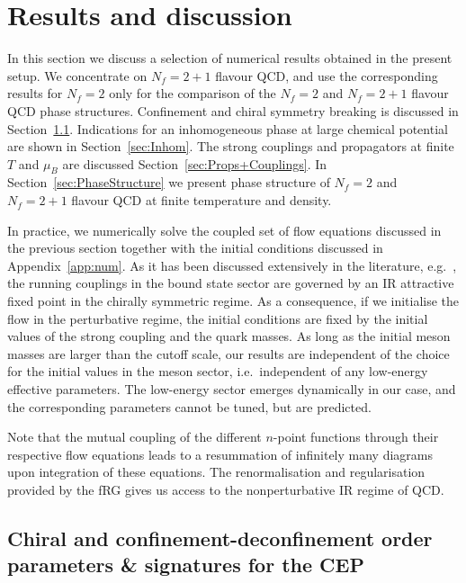 \documentclass[%
reprint,
superscriptaddress,
showpacs,preprintnumbers,
 amsmath,amssymb,
 aps,
prd,
]{revtex4-1}
\def\sec#1{Section~\ref{#1}}
\def\app#1{Appendix~\ref{#1}}
\begin{document}
\section{Results and discussion}
\label{sec:num}
%

In this section we discuss a selection of numerical results obtained
in the present setup. We concentrate on $N_f=2+1$ flavour QCD, and use
the corresponding results for $N_f=2$ only for the comparison of the
$N_f=2$ and $N_f=2+1$ flavour QCD phase structures. Confinement and
chiral symmetry breaking is discussed in
\sec{sec:Conf+Chiral}. Indications for an inhomogeneous phase at large
chemical potential are shown in \sec{sec:Inhom}. The strong couplings
and propagators at finite $T$ and $\mu_B$ are discussed
\sec{sec:Props+Couplings}. In \sec{sec:PhaseStructure} we present
phase structure of $N_f=2$ and $N_f=2+1$ flavour QCD at finite
temperature and density.


In practice, we numerically solve the coupled set of flow equations
discussed in the previous section together with the initial conditions
discussed in \app{app:num}. As it has been discussed extensively in
the literature, e.g.\, \cite{Gies:2002hq, Braun:2005uj, Braun:2009ns,
  Braun:2010qs, Mitter:2014wpa,Braun:2014ata,Pawlowski:2014aha,
  Rennecke:2015eba,Cyrol:2017ewj}, the running couplings in the bound
state sector are governed by an IR attractive fixed point in the
chirally symmetric regime. As a consequence, if we initialise the flow
in the perturbative regime, the initial conditions are fixed by the
initial values of the strong coupling and the quark masses.  As long
as the initial meson masses are larger than the cutoff scale, our
results are independent of the choice for the initial values in the
meson sector, i.e.\ independent of any low-energy effective
parameters. The low-energy sector emerges dynamically in our case, and
the corresponding parameters cannot be tuned, but are predicted.

Note that the mutual coupling of the different $n$-point functions
through their respective flow equations leads to a resummation of
infinitely many diagrams upon integration of these equations. The
renormalisation and regularisation provided by the fRG gives us access
to the nonperturbative IR regime of QCD.



 

\subsection{Chiral and confinement-deconfinement order parameters \&
  signatures for the CEP}\label{sec:Conf+Chiral}
\end{document}
